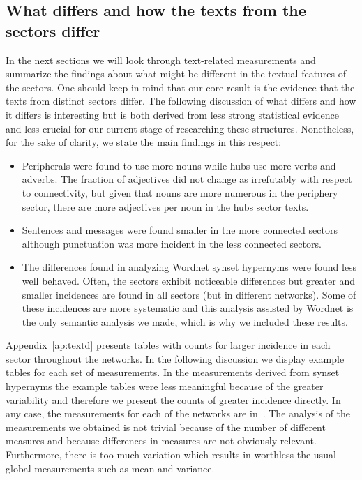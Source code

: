  \FloatBarrier
 \subsection{What differs and how the texts from the sectors differ}
 In the next sections we will look through text-related measurements
 and summarize the findings about what might be different in
 the textual features of the sectors.
 One should keep in mind that our core result is the evidence that
 the texts from distinct sectors differ.
 The following discussion of what differs and how it differs
 is interesting but is both derived from less strong statistical evidence and less crucial for our current stage of researching these structures.
 Nonetheless, for the sake of clarity, we state the main findings in this respect:
 \begin{itemize}
\item Peripherals were found to use more nouns while hubs use more verbs and adverbs. The fraction of adjectives did not change as irrefutably with respect to connectivity, but given that nouns are more numerous in the periphery sector, there are more adjectives per noun in the hubs sector texts.
\item Sentences and messages were found smaller in the more connected sectors although punctuation was more incident in the less connected sectors.
\item The differences found in analyzing Wordnet synset hypernyms were found less well behaved. Often, the sectors exhibit noticeable differences but greater and smaller incidences are found in all sectors (but in different networks). Some of these incidences are more systematic and this analysis assisted by Wordnet is the only semantic analysis we made, which is why we included these results.
\end{itemize}
Appendix~\ref{ap:textd} presents tables with counts for larger incidence in each sector throughout the networks. In the following discussion we display example tables for each set of measurements.
In the measurements derived from synset hypernyms the example tables were less meaningful because of the greater variability and therefore we present the counts of greater incidence directly.
In any case, the measurements for each of the networks are in~\cite{textTables}.
The analysis of the measurements we obtained
is not trivial because of the number of different measures
and because differences in measures are not obviously relevant.
Furthermore, there is too much variation
which results in worthless the usual global measurements such as mean and variance.
